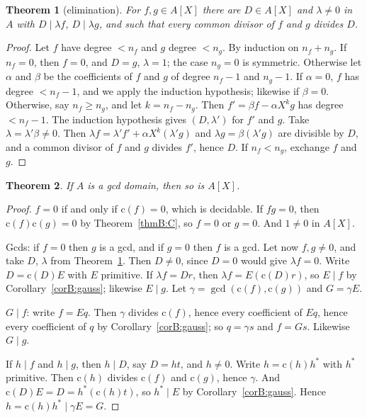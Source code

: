 \documentclass[11pt]{amsart}
\newtheorem{theorem}{Theorem}[section]
\theoremstyle{definition}
\theoremstyle{remark}
\newcommand{\cont}{\mathrm{c}}
\newcommand{\gcdd}{\operatorname{gcd}}
\begin{document}
\begin{theorem}[elimination]\label{thmB:elim}
For $f,g\in A[X]$ there are $D\in A[X]$ and $\lambda\neq0$ in $A$ with
$D\mid\lambda f$, $D\mid\lambda g$, and such that every common divisor of
$f$ and $g$ divides $D$.
\end{theorem}
\begin{proof}
Let $f$ have degree $<n_f$ and $g$ degree $<n_g$. By induction on
$n_f+n_g$. If $n_f = 0$, then $f = 0$, and $D = g$, $\lambda = 1$; the
case $n_g = 0$ is symmetric. Otherwise let $\alpha$ and $\beta$ be the
coefficients of $f$ and $g$ of degree $n_f-1$ and $n_g-1$. If
$\alpha = 0$, $f$ has degree $<n_f-1$, and we apply the induction
hypothesis; likewise if $\beta = 0$. Otherwise, say $n_f\ge n_g$, and let
$k = n_f - n_g$. Then $f' = \beta f - \alpha X^kg$ has degree $<n_f-1$.
The induction hypothesis gives $(D,\lambda')$ for $f'$ and $g$. Take
$\lambda = \lambda'\beta\neq0$. Then
$\lambda f = \lambda'f' + \alpha X^k(\lambda'g)$ and
$\lambda g = \beta(\lambda'g)$ are divisible by $D$, and a common divisor
of $f$ and $g$ divides $f'$, hence $D$. If $n_f<n_g$, exchange $f$ and
$g$.
\end{proof}

\begin{theorem}
If $A$ is a gcd domain, then so is $A[X]$.
\end{theorem}
\begin{proof}
$f = 0$ if and only if $\cont(f) = 0$, which is decidable. If $fg = 0$,
then $\cont(f)\cont(g) = 0$ by Theorem~\ref{thmB:C}, so $f=0$ or $g=0$.
And $1\neq0$ in $A[X]$.

Gcds: if $f=0$ then $g$ is a gcd, and if $g = 0$ then $f$ is a gcd. Let
now $f,g\neq0$, and take $D$, $\lambda$ from Theorem~\ref{thmB:elim}.
Then $D\neq0$, since $D = 0$ would give $\lambda f = 0$. Write
$D = \cont(D)E$ with $E$ primitive. If $\lambda f = Dr$, then
$\lambda f = E(\cont(D)r)$, so $E\mid f$ by
Corollary~\ref{corB:gauss}; likewise $E\mid g$. Let
$\gamma = \gcdd(\cont(f),\cont(g))$ and $G = \gamma E$.

$G\mid f$: write $f = Eq$. Then $\gamma$ divides $\cont(f)$, hence every
coefficient of $Eq$, hence every coefficient of $q$ by
Corollary~\ref{corB:gauss}; so $q = \gamma s$ and $f = Gs$. Likewise
$G\mid g$.

If $h\mid f$ and $h\mid g$, then $h\mid D$, say $D = ht$, and $h\neq0$.
Write $h = \cont(h)h^*$ with $h^*$ primitive. Then $\cont(h)$ divides
$\cont(f)$ and $\cont(g)$, hence $\gamma$. And
$\cont(D)E = D = h^*(\cont(h)t)$, so $h^*\mid E$ by
Corollary~\ref{corB:gauss}. Hence $h = \cont(h)h^*\mid\gamma E = G$.
\end{proof}
\end{document}
